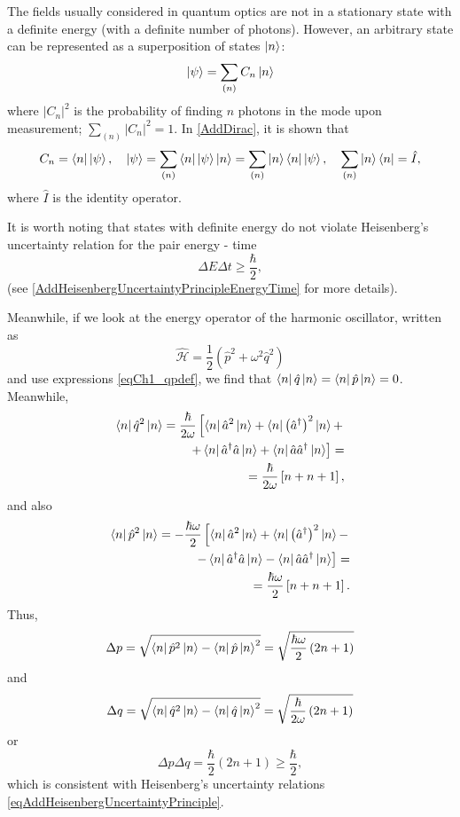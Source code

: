 The fields usually considered in quantum optics are not in a
stationary state with a definite energy (with a definite number
of photons). However, an arbitrary state can be represented as
a superposition of states $\ket{n}$: 
\begin{equation}
\left|\psi\right> = \sum_{(n)} C_n \ket{n}
\end{equation}
where $\left|C_n\right|^2$ is the probability of finding $n$ photons in the mode
upon measurement; $\sum_{(n)} \left|C_n\right|^2 = 1$. 
In \autoref{AddDirac}, it is shown that
\[
C_n = \bra{ n }\left| \psi \right>, \quad
\left| \psi \right> = \sum_{(n)} \bra{ n }\left| \psi \right>
\ket{ n } =
\sum_{(n)} \ket{ n }\bra{ n }\left| \psi \right>,
\quad
\sum_{(n)} \ket{ n }\bra{ n } = \hat{I},
\]
where $\hat{I}$ is the identity operator.

\begin{remark}
  It is worth noting that states with definite energy do not violate 
  Heisenberg's uncertainty relation for the pair
  energy - time
  \[
  \Delta E \Delta t \ge \frac{\hbar}{2},
  \]
  (see \autoref{AddHeisenbergUncertaintyPrincipleEnergyTime} for more details). 

  Meanwhile, if we look at the energy operator of the harmonic
  oscillator, written as
  \[
  \hat{\mathcal{H}} =\frac{1}{2} \left(\hat{p}^2 +
  \omega^2\hat{q}^2\right)
  \]
  and use expressions \eqref{eqCh1_qpdef}, we find that $\bra{n}\hat{q}\ket{n} =
  \bra{n}\hat{p}\ket{n} = 0$. Meanwhile,
  \begin{eqnarray}
    \bra{n}\hat{q}^2\ket{n} = \frac{\hbar}{2 \omega}
    \left[
      \bra{n}\hat{a}^2\ket{n} +
      \bra{n}\left(\hat{a}^{\dag}\right)^2\ket{n} +
      \right.
      \nonumber \\
      \left.
      +
      \bra{n}\hat{a}^{\dag}\hat{a}\ket{n} +
      \bra{n}\hat{a}\hat{a}^{\dag}\ket{n}
      \right] =
    \nonumber \\
    = \frac{\hbar}{2 \omega}
    \left[n + n + 1\right],
    \nonumber
  \end{eqnarray}
  and also
  \begin{eqnarray}
    \bra{n}\hat{p}^2\ket{n} = - \frac{\hbar \omega}{2}
    \left[
      \bra{n}\hat{a}^2\ket{n} +
      \bra{n}\left(\hat{a}^{\dag}\right)^2\ket{n} - \right.
      \nonumber \\
      \left.
      -
      \bra{n}\hat{a}^{\dag}\hat{a}\ket{n} -
      \bra{n}\hat{a}\hat{a}^{\dag}\ket{n}
      \right] =
    \nonumber \\
    = \frac{\hbar \omega}{2}
    \left[n + n + 1\right].
    \nonumber
  \end{eqnarray}
  Thus,
  \[
  \Delta p = \sqrt{\bra{n}\hat{p}^2\ket{n} -
    \bra{n}\hat{p}\ket{n}^2} =
  \sqrt{\frac{\hbar \omega}{2}\left(2n + 1\right)}
  \]
  and
  \[
  \Delta q = \sqrt{\bra{n}\hat{q}^2\ket{n} -
    \bra{n}\hat{q}\ket{n}^2} =
  \sqrt{\frac{\hbar}{2\omega}\left(2n + 1\right)}
  \]
  or
  \[
  \Delta p \Delta q = \frac{\hbar}{2}\left(2n + 1\right) \ge \frac{\hbar}{2},
  \]
  which is consistent with Heisenberg's uncertainty relations \eqref{eqAddHeisenbergUncertaintyPrinciple}.


\end{remark}
